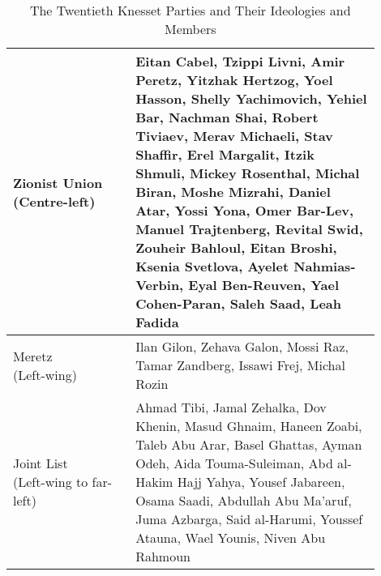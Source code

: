 \begin{table}
\begin{tabular}{|p{0.3\linewidth}|p{0.6\linewidth}|}
\hline
\makecell{Zionist Union \\ (Centre-left)}  & Eitan Cabel, Tzippi Livni, Amir Peretz, Yitzhak Hertzog, Yoel Hasson, Shelly Yachimovich, Yehiel Bar, Nachman Shai, Robert Tiviaev, Merav Michaeli, Stav Shaffir, Erel Margalit, Itzik Shmuli, Mickey Rosenthal, Michal Biran, Moshe Mizrahi, Daniel Atar, Yossi Yona, Omer Bar-Lev, Manuel Trajtenberg, Revital Swid, Zouheir Bahloul, Eitan Broshi, Ksenia Svetlova, Ayelet Nahmias-Verbin, Eyal Ben-Reuven, Yael Cohen-Paran, Saleh Saad, Leah Fadida    \\
\hline
\makecell{Meretz \\ (Left-wing)}  & Ilan Gilon, Zehava Galon, Mossi Raz, Tamar Zandberg, Issawi Frej, Michal Rozin                                                                                                                                                                                                                                                                                                                                                                              \\
\hline
\makecell{Joint List \\ (Left-wing to far-left)}  & Ahmad Tibi, Jamal Zehalka, Dov Khenin, Masud Ghnaim, Haneen Zoabi, Taleb Abu Arar, Basel Ghattas, Ayman Odeh, Aida Touma-Suleiman, Abd al-Hakim Hajj Yahya, Yousef Jabareen, Osama Saadi, Abdullah Abu Ma'aruf, Juma Azbarga, Said al-Harumi, Youssef Atauna, Wael Younis, Niven Abu Rahmoun                                                                                                                                                                \\
\hline
\end{tabular}
\caption{The Twentieth Knesset Parties and Their Ideologies and Members}
\label{table:knesset_party_members}
\end{table}

